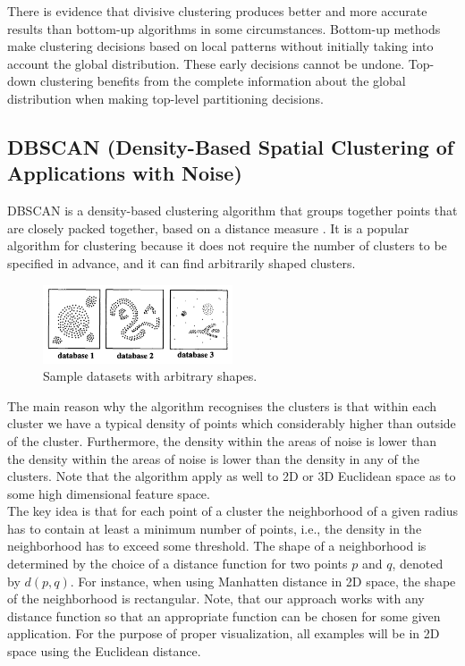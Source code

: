 \documentclass[conference]{IEEEtran}
\begin{document}
There is evidence that divisive clustering produces better and more accurate results than bottom-up algorithms in some circumstances. Bottom-up methods make clustering decisions based on local patterns without initially taking into account the global distribution. These early decisions cannot be undone. Top-down clustering benefits from the complete information about the global distribution when making top-level partitioning decisions. \\

\subsection{DBSCAN (Density-Based Spatial Clustering of Applications with Noise)}
DBSCAN is a density-based clustering algorithm that groups together points that are closely packed together, based on a distance measure \cite{ester1996dbscan}. It is a popular algorithm for clustering because it does not require the number of clusters to be specified in advance, and it can find arbitrarily shaped clusters. \\

\begin{figure}[h]
    \centering
    \includegraphics[width=0.5\textwidth]{dbscan_ds.png}
    \caption{Sample datasets with arbitrary shapes.}
    \label{fig:dbscan}
\end{figure}

The main reason why the algorithm recognises the clusters is that within each cluster we have a typical density of points which considerably higher than outside of the cluster. Furthermore, the density within the areas of noise is lower than the density within the areas of noise is lower than the density in any of the clusters. Note that the algorithm apply as well to 2D or 3D Euclidean space as to some high dimensional feature space. \\

The key idea is that for each point of a cluster the neighborhood of a given radius has to contain at least a minimum number of points, i.e., the density in the neighborhood has to exceed some threshold. The shape of a neighborhood is determined by the choice of a distance function for two points \( p \) and \( q \), denoted by \( d(p, q) \). For instance, when using Manhatten distance in 2D space, the shape of the neighborhood is rectangular. Note, that our approach works with any distance function so that an appropriate function can be chosen for some given application. For the purpose of proper visualization, all examples will be in 2D space using the Euclidean distance. \\
\end{document}
